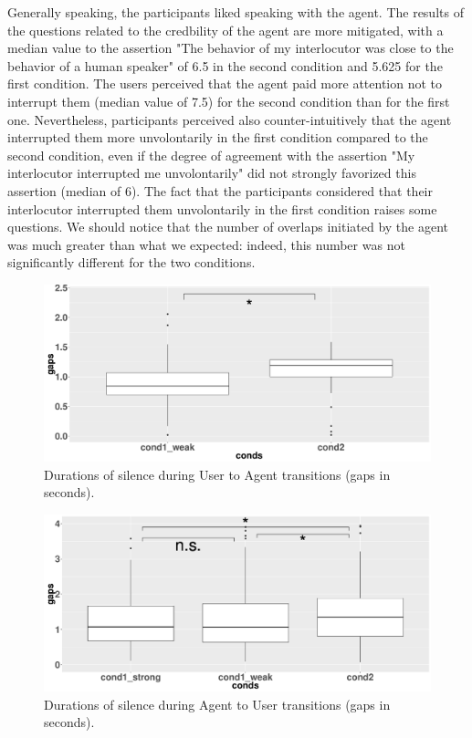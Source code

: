 Generally speaking, the participants liked speaking with the agent. The results of the questions related to the credbility of the agent are more mitigated, with a median value to the assertion "The behavior of my interlocutor was close to the behavior of a human speaker" of 6.5 in the second condition and 5.625 for the first condition. The users perceived that the agent paid more attention not to interrupt them (median value of 7.5) for the second condition than for the first one. Nevertheless, participants perceived also counter-intuitively that the agent interrupted them more unvolontarily in the first condition compared to the second condition, even if the degree of agreement with the assertion "My interlocutor interrupted me unvolontarily" did not strongly favorized this assertion (median of 6). 
The fact that the participants considered that their interlocutor interrupted them unvolontarily in the first condition raises some questions. We should notice that the number of overlaps initiated by the agent was much greater than what we expected: indeed, this number was not significantly different for the two conditions.

\begin{figure}
\centering
\includegraphics[width=\linewidth]{figure/boxTransitionsUA.pdf}
\caption{Durations of silence during User to Agent transitions (gaps in seconds).}
\label{box_ua}
\end{figure}

\begin{figure}
\centering
\includegraphics[width=\linewidth]{figure/boxTransitionsAU.pdf}
\caption{Durations of silence during Agent to User transitions (gaps in seconds).}
\label{box_au}
\end{figure}


